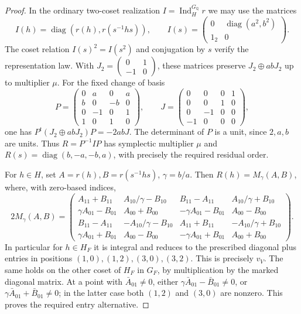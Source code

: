 \begin{proof}
In the ordinary two-coset realization \(I=\operatorname{Ind}_H^{G_{\mathbb Q}}r\)
we may use the matrices
\[
 I(h)=\operatorname{diag}(r(h),r(s^{-1}hs)),\qquad
 I(s)=\begin{pmatrix}0&\operatorname{diag}(a^2,b^2)\\1_2&0\end{pmatrix}.
\]
The coset relation \(I(s)^2=I(s^2)\) and conjugation by \(s\)
verify the representation law. With \(J_2=\left(\begin{smallmatrix}0&1\\-1&0\end{smallmatrix}\right)\),
these matrices preserve \(J_2\oplus abJ_2\) up to multiplier \(\mu\).
For the fixed change of basis
\[
 P=\begin{pmatrix}0&a&0&a\\ b&0&-b&0\\
                   0&-1&0&1\\1&0&1&0\end{pmatrix},\qquad
 J=\begin{pmatrix}0&0&0&1\\0&0&1&0\\0&-1&0&0\\-1&0&0&0\end{pmatrix},
\]
one has \(P^t(J_2\oplus abJ_2)P=-2abJ\).
The determinant of \(P\) is a unit, since \(2,a,b\) are units.
Thus \(R=P^{-1}IP\) has symplectic multiplier \(\mu\) and
\(R(s)=\operatorname{diag}(b,-a,-b,a)\), with precisely the
required residual order.

For \(h\in H\), set \(A=r(h), B=r(s^{-1}hs)\), \(\gamma=b/a\).
Then \(R(h)=M_\gamma(A,B)\), where, with zero-based indices,
\[
2M_\gamma(A,B)=
\begin{pmatrix}
 A_{11}+B_{11}&A_{10}/\gamma-B_{10}&B_{11}-A_{11}&A_{10}/\gamma+B_{10}\\
 \gamma A_{01}-B_{01}&A_{00}+B_{00}&-\gamma A_{01}-B_{01}&A_{00}-B_{00}\\
 B_{11}-A_{11}&-A_{10}/\gamma-B_{10}&A_{11}+B_{11}&-A_{10}/\gamma+B_{10}\\
 \gamma A_{01}+B_{01}&A_{00}-B_{00}&-\gamma A_{01}+B_{01}&A_{00}+B_{00}
\end{pmatrix}.
\]
In particular for \(h\in H_F\) it is integral and reduces to
the prescribed diagonal plus entries in positions
\((1,0),(1,2),(3,0),(3,2)\). This is precisely \(v_V\).
The same holds on the other coset of \(H_F\) in \(G_F\),
by multiplication by the marked diagonal matrix.
At a point with \(\bar A_{01}\ne0\), either
\(\gamma\bar A_{01}-\bar B_{01}\ne0\), or
\(\gamma\bar A_{01}+\bar B_{01}\ne0\); in the latter case both
\((1,2)\) and \((3,0)\) are nonzero. This proves the required
entry alternative.


\end{proof}
